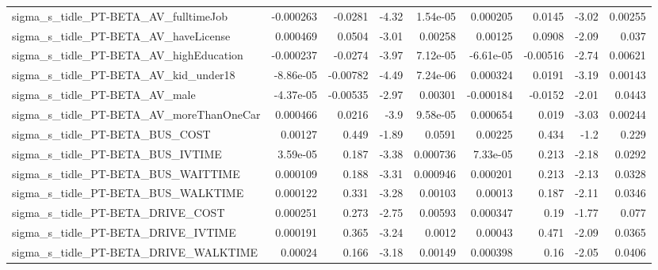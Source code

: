 \begin{tabular}{lrrrrrrrr}
sigma\_s\_tidle\_PT-BETA\_AV\_fulltimeJob               &   -0.000263 &      -0.0281 &     -4.32 & 1.54e-05 &   0.000205 &      0.0145 &        -3.02 &       0.00255 \\
sigma\_s\_tidle\_PT-BETA\_AV\_haveLicense               &    0.000469 &       0.0504 &     -3.01 &  0.00258 &    0.00125 &      0.0908 &        -2.09 &         0.037 \\
sigma\_s\_tidle\_PT-BETA\_AV\_highEducation             &   -0.000237 &      -0.0274 &     -3.97 & 7.12e-05 &  -6.61e-05 &    -0.00516 &        -2.74 &       0.00621 \\
sigma\_s\_tidle\_PT-BETA\_AV\_kid\_under18               &   -8.86e-05 &     -0.00782 &     -4.49 & 7.24e-06 &   0.000324 &      0.0191 &        -3.19 &       0.00143 \\
sigma\_s\_tidle\_PT-BETA\_AV\_male                      &   -4.37e-05 &     -0.00535 &     -2.97 &  0.00301 &  -0.000184 &     -0.0152 &        -2.01 &        0.0443 \\
sigma\_s\_tidle\_PT-BETA\_AV\_moreThanOneCar            &    0.000466 &       0.0216 &      -3.9 & 9.58e-05 &   0.000654 &       0.019 &        -3.03 &       0.00244 \\
sigma\_s\_tidle\_PT-BETA\_BUS\_COST                     &     0.00127 &        0.449 &     -1.89 &   0.0591 &    0.00225 &       0.434 &         -1.2 &         0.229 \\
sigma\_s\_tidle\_PT-BETA\_BUS\_IVTIME                   &    3.59e-05 &        0.187 &     -3.38 & 0.000736 &   7.33e-05 &       0.213 &        -2.18 &        0.0292 \\
sigma\_s\_tidle\_PT-BETA\_BUS\_WAITTIME                 &    0.000109 &        0.188 &     -3.31 & 0.000946 &   0.000201 &       0.213 &        -2.13 &        0.0328 \\
sigma\_s\_tidle\_PT-BETA\_BUS\_WALKTIME                 &    0.000122 &        0.331 &     -3.28 &  0.00103 &    0.00013 &       0.187 &        -2.11 &        0.0346 \\
sigma\_s\_tidle\_PT-BETA\_DRIVE\_COST                   &    0.000251 &        0.273 &     -2.75 &  0.00593 &   0.000347 &        0.19 &        -1.77 &         0.077 \\
sigma\_s\_tidle\_PT-BETA\_DRIVE\_IVTIME                 &    0.000191 &        0.365 &     -3.24 &   0.0012 &    0.00043 &       0.471 &        -2.09 &        0.0365 \\
sigma\_s\_tidle\_PT-BETA\_DRIVE\_WALKTIME               &     0.00024 &        0.166 &     -3.18 &  0.00149 &   0.000398 &        0.16 &        -2.05 &        0.0406 \\

\end{tabular}
